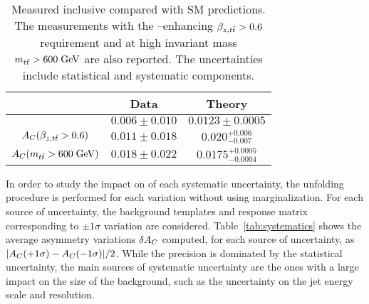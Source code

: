 \begin{table}[!htb]\centering
\begin{tabular}{c c c}
\toprule
  & Data & Theory\\
\midrule
 \ac{}                                     & $0.006\pm0.010$ & $0.0123\pm0.0005$ \\
 $A_C{}(\beta_{z,t\bar{t}}>0.6)$   & $0.011\pm0.018$ & $0.020^{+0.006}_{-0.007}$\\
 $A_C{}(m_{t\bar{t}}{} > 600 \; \mathrm{GeV}{})$ & $0.018\pm0.022$ & $0.0175^{+0.0005}_{-0.0004}$\\
\bottomrule
\end{tabular}
\caption{Measured inclusive \ac{} compared with SM
  predictions. The measurements with the \qqbar{}--enhancing
  $\beta_{z,t\bar{t}} > 0.6$ requirement and at high \ttbar{} invariant
  mass $m_{t\bar{t}}{} > 600 \; \mathrm{GeV}{}$ are also reported. The uncertainties
  include statistical and systematic components.}
\label{tab:results}
\end{table}

In order to study the impact on \ac{} of each systematic uncertainty,
the unfolding procedure is performed for each variation without using
marginalization. 
For each source of uncertainty, the background templates and
response matrix corresponding to $\pm1\sigma$ variation are
considered. 
Table~\ref{tab:systematics} shows the average asymmetry variations
$\delta A_C{}$ computed, for each source of uncertainty, as
$|A_C{}(+1\sigma)-A_C{}(-1\sigma)|/2$. 
While the precision is dominated by the statistical uncertainty, the main
sources of systematic uncertainty are the ones with a large
impact on the size of the \wjets{} background, such as the
uncertainty on the jet energy scale and resolution. 

